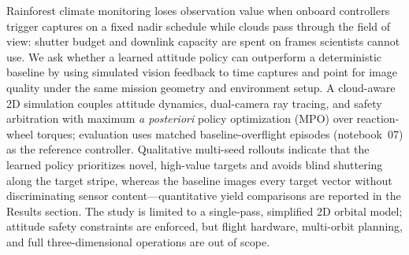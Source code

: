 Rainforest climate monitoring loses observation value when onboard controllers trigger captures on a fixed nadir schedule while clouds pass through the field of view: shutter budget and downlink capacity are spent on frames scientists cannot use.
We ask whether a learned attitude policy can outperform a deterministic baseline by using simulated vision feedback to time captures and point for image quality under the same mission geometry and environment setup.
A cloud-aware 2D simulation couples attitude dynamics, dual-camera ray tracing, and safety arbitration with maximum \emph{a posteriori} policy optimization (MPO) over reaction-wheel torques; evaluation uses matched baseline-overflight episodes (notebook~07) as the reference controller.
Qualitative multi-seed rollouts indicate that the learned policy prioritizes novel, high-value targets and avoids blind shuttering along the target stripe, whereas the baseline images every target vector without discriminating sensor content---quantitative yield comparisons are reported in the Results section.
The study is limited to a single-pass, simplified 2D orbital model; attitude safety constraints are enforced, but flight hardware, multi-orbit planning, and full three-dimensional operations are out of scope.
